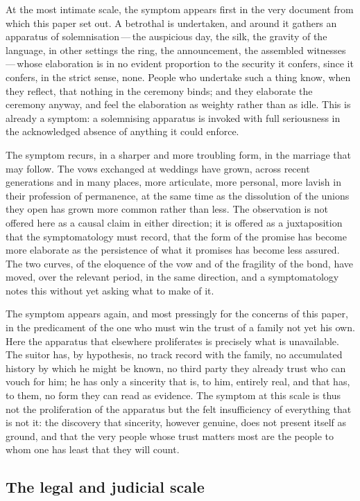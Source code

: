 At the most intimate scale, the symptom appears first in the very document from which this paper set out. A betrothal is undertaken, and around it gathers an apparatus of solemnisation\,---\,the auspicious day, the silk, the gravity of the language, in other settings the ring, the announcement, the assembled witnesses\,---\,whose elaboration is in no evident proportion to the security it confers, since it confers, in the strict sense, none. People who undertake such a thing know, when they reflect, that nothing in the ceremony binds; and they elaborate the ceremony anyway, and feel the elaboration as weighty rather than as idle. This is already a symptom: a solemnising apparatus is invoked with full seriousness in the acknowledged absence of anything it could enforce.

The symptom recurs, in a sharper and more troubling form, in the marriage that may follow. The vows exchanged at weddings have grown, across recent generations and in many places, more articulate, more personal, more lavish in their profession of permanence, at the same time as the dissolution of the unions they open has grown more common rather than less. The observation is not offered here as a causal claim in either direction; it is offered as a juxtaposition that the symptomatology must record, that the form of the promise has become more elaborate as the persistence of what it promises has become less assured. The two curves, of the eloquence of the vow and of the fragility of the bond, have moved, over the relevant period, in the same direction, and a symptomatology notes this without yet asking what to make of it.

The symptom appears again, and most pressingly for the concerns of this paper, in the predicament of the one who must win the trust of a family not yet his own. Here the apparatus that elsewhere proliferates is precisely what is unavailable. The suitor has, by hypothesis, no track record with the family, no accumulated history by which he might be known, no third party they already trust who can vouch for him; he has only a sincerity that is, to him, entirely real, and that has, to them, no form they can read as evidence. The symptom at this scale is thus not the proliferation of the apparatus but the felt insufficiency of everything that is not it: the discovery that sincerity, however genuine, does not present itself as ground, and that the very people whose trust matters most are the people to whom one has least that they will count.

\subsection{The legal and judicial scale}
\label{p13:sub:sympt-legal}

